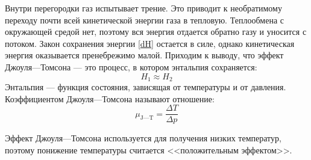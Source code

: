 \documentclass[a4paper,12pt]{report}
\begin{document}
\begin{multicols}{2}
        Внутри перегородки газ испытывает трение. Это приводит к необратимому переходу почти всей кинетической энергии газа в тепловую. Теплообмена с окружающей средой нет, поэтому вся энергия отдается обратно газу и уносится с потоком. Закон сохранения энергии \eqref{dH} остается в силе, однако кинетическая энергия оказывается пренебрежимо малой. Приходим к выводу, что эффект Джоуля---Томсона --- это процесс, в котором энтальпия сохраняется:
        \begin{equation}
            \label{H1=H2}
            H_1\approx H_2
        \end{equation}
        Энтальпия --- функция состояния, зависящая от температуры и от давления. Коэффициентом Джоуля---Томсона называют отношение:
        \begin{equation}
            \label{coefD-T}
            \mu_{\text{J---T}}=\frac{\Delta T}{\Delta p}
        \end{equation}

        Эффект Джоуля---Томсона используется для получения низких температур, поэтому понижение температуры считается <<положительным эффектом>>.


\end{multicols}
\end{document}
